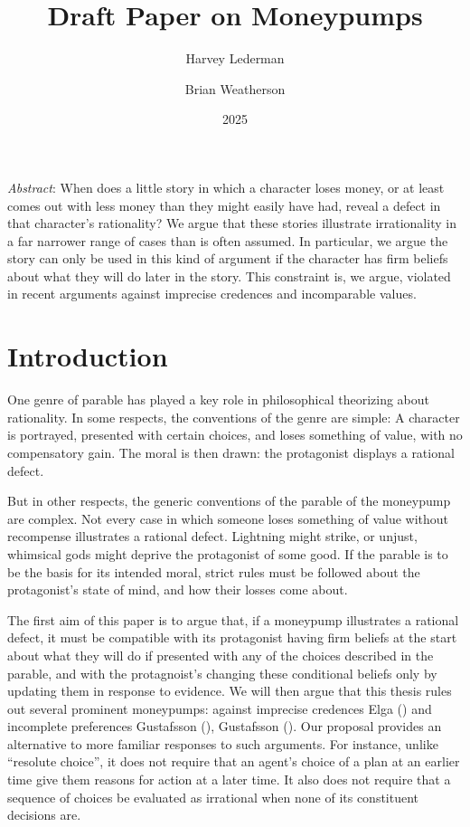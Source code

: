 \documentclass[
  11pt,
  letterpaper,
  DIV=11,
  numbers=noendperiod,
  twoside]{scrartcl}
\title{Draft Paper on Moneypumps}
\author{Harvey Lederman \and Brian Weatherson}
\date{2025}
\renewenvironment{abstract}
 {\vspace{-1.25cm}
 \quotation\small\noindent\emph{Abstract}:}
 {\endquotation}
\renewenvironment{abstract}
 {\quotation\small\noindent\emph{Abstract}:}
 {\endquotation\vspace{-0.02cm}}
\begin{document}
\maketitle
\begin{abstract}
When does a little story in which a character loses money, or at least
comes out with less money than they might easily have had, reveal a
defect in that character's rationality? We argue that these stories
illustrate irrationality in a far narrower range of cases than is often
assumed. In particular, we argue the story can only be used in this kind
of argument if the character has firm beliefs about what they will do
later in the story. This constraint is, we argue, violated in recent
arguments against imprecise credences and incomparable values.
\end{abstract}


\section{Introduction}\label{introduction}

One genre of parable has played a key role in philosophical theorizing
about rationality. In some respects, the conventions of the genre are
simple: A character is portrayed, presented with certain choices, and
loses something of value, with no compensatory gain. The moral is then
drawn: the protagonist displays a rational defect.

But in other respects, the generic conventions of the parable of the
moneypump are complex. Not every case in which someone loses something
of value without recompense illustrates a rational defect. Lightning
might strike, or unjust, whimsical gods might deprive the protagonist of
some good. If the parable is to be the basis for its intended moral,
strict rules must be followed about the protagonist's state of mind, and
how their losses come about.

The first aim of this paper is to argue that, if a moneypump illustrates
a rational defect, it must be compatible with its protagonist having
firm beliefs at the start about what they will do if presented with any
of the choices described in the parable, and with the protagnoist's
changing these conditional beliefs only by updating them in response to
evidence. We will then argue that this thesis rules out several
prominent moneypumps: against imprecise credences Elga
() and incomplete preferences Gustafsson
(), Gustafsson
(). Our proposal provides an
alternative to more familiar responses to such arguments. For instance,
unlike ``resolute choice'', it does not require that an agent's choice
of a plan at an earlier time give them reasons for action at a later
time. It also does not require that a sequence of choices be evaluated
as irrational when none of its constituent decisions are.
\end{document}
